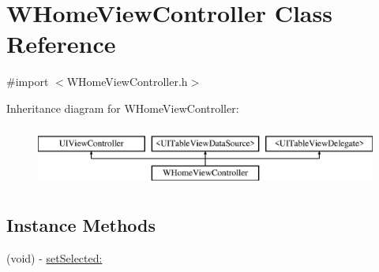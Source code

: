 \hypertarget{interface_w_home_view_controller}{\section{W\-Home\-View\-Controller Class Reference}
\label{interface_w_home_view_controller}
}


{\ttfamily \#import $<$W\-Home\-View\-Controller.\-h$>$}

Inheritance diagram for W\-Home\-View\-Controller\-:\begin{figure}[H]
\begin{center}
\leavevmode
\includegraphics[height=2.000000cm]{interface_w_home_view_controller}
\end{center}
\end{figure}
\subsection*{Instance Methods}
\begin{DoxyCompactItemize}
\item 
(void) -\/ \hyperlink{interface_w_home_view_controller_ae4b67cbb0609ab557c3a2a7ea6ab903d}{set\-Selected\-:}
\end{DoxyCompactItemize}
